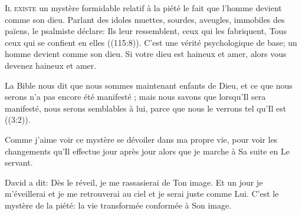 


\lettrine{I}{l existe} un mystère formidable relatif à la piété
 \ocadr le fait que l'homme devient comme son dieu.
 Parlant des idoles muettes, sourdes, aveugles, immobiles des païens,
 le psalmiste déclare: 
 \Og Ils leur ressemblent, ceux qui les fabriquent,
 Tous ceux qui se confient en elles \Fg{} ((115:8)).
 C'est une vérité psychologique de base;
 un homme devient comme son dieu.
 Si votre dieu est haineux et amer, alors vous devenez haineux et amer.


La Bible nous dit que \Og nous 
 sommes maintenant enfants de Dieu, et ce que nous serons n'a pas encore
 été manifesté ; mais nous savons que lorsqu'Il sera manifesté,
 nous serons semblables à lui, parce que nous le verrons
 tel qu'Il est \Fg{} ((3:2)).

Comme j'aime voir ce mystère se dévoiler dans ma propre vie,
 pour voir les changements qu'Il effectue jour après jour
 alors que je marche à Sa suite en Le servant.

David a dit: 
 \Og Dès le réveil, je me rassasierai de Ton image. \Fg{}
 Et un jour je m'éveillerai et je me retrouverai au ciel
 et je serai juste comme Lui. C'est le mystère de la piété:
 la vie transformée conformée à Son image.

\dvrule






